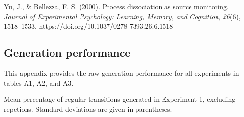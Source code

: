 \documentclass[english,,man]{apa6}
\begin{document}
\leavevmode\hypertarget{ref-yu_process_2000}{}%
Yu, J., \& Bellezza, F. S. (2000). Process dissociation as source monitoring. \emph{Journal of Experimental Psychology: Learning, Memory, and Cognition}, \emph{26}(6), 1518--1533. \url{https://doi.org/10.1037/0278-7393.26.6.1518}

\clearpage
\makeatletter
\efloat@restorefloats
\makeatother


\begin{appendix}
\hypertarget{generation-performance}{%
\section{Generation performance}\label{generation-performance}}

This appendix provides the raw generation performance for all
experiments in tables A1, A2, and A3.

\begin{table}[hp]

\begin{center}
\begin{threeparttable}

\caption{\label{tab:appendix-pdl9-generation}Mean percentage of regular transitions generated in Experiment 1, excluding repetions. Standard deviations are given in parentheses.}


\end{threeparttable}
\end{center}
\end{table}
\end{appendix}
\end{document}
